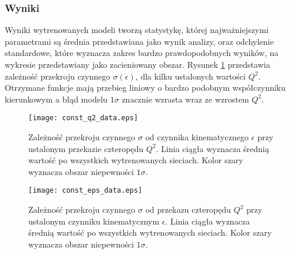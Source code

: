 \documentclass[11pt]{book}
\theoremstyle{definition}
\begin{document}
\subsubsection{Wyniki}
%
Wyniki wytrenowanych modeli tworzą statystykę, której najważniejszymi parametrami są średnia przedstawiana jako wynik analizy, oraz odchylenie standardowe, które wyznacza zakres bardzo prawdopodobnych wyników, na wykresie przedstawiany jako zacieniowany obszar.
Rysunek \ref{fig:const_q2} przedstawia zależność przekroju czynnego $\sigma\left(\epsilon\right)$, dla kilku ustalonych wartości $Q^2$. Otrzymane funkcje mają przebieg liniowy o bardzo podobnym współczynniku kierunkowym a błąd modelu $1\sigma$ znacznie wzrasta wraz ze wzrostem $Q^2$.
%
%
\begin{figure}[htp!]
	\centering
	\texttt{[image: const\_q2\_data.eps]}
	\caption{Zależność przekroju czynnego $\sigma$ od czynnika kinematycznego $\epsilon$ przy ustalonym przekazie czteropędu $Q^2$. Linia ciągła wyznacza średnią wartość po wszystkich wytrenowanych sieciach. Kolor szary wyznacza obszar niepewności $1\sigma$.} 
	\label{fig:const_q2}
\end{figure}
%
%
\begin{figure}[htp!]
	\centering
	\texttt{[image: const\_eps\_data.eps]}
	\caption{Zależność przekroju czynnego $\sigma$ od przekazu czteropędu $Q^2$ przy ustalonym czynniku kinematycznym $\epsilon$. Linia ciągła wyznacza średnią wartość po wszystkich wytrenowanych sieciach. Kolor szary wyznacza obszar niepewności $1\sigma$.} 
	\label{fig:const_eps}
\end{figure}
%
\end{document}
